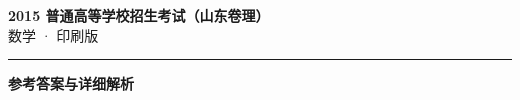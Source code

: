 \documentclass[zihao=5, a4paper]{ctexart}
\begin{document}
\begin{center}
  {\Large\bfseries 2015 普通高等学校招生考试（山东卷理）}\\[4pt]
  {\large 数学 · 印刷版}
\end{center}
\medskip
{}

\par\bigskip\hrule\bigskip
{}
\begin{center}{\large\bfseries 参考答案与详细解析}\end{center}
\smallskip

\end{document}
